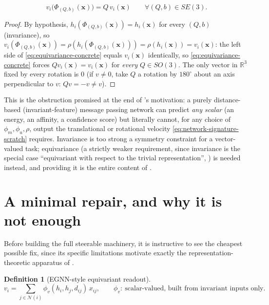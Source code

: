 \documentclass[11pt,a4paper]{report}
\theoremstyle{definition}
\newtheorem{definition}[definition]{Definition}
\theoremstyle{remark}
\newcommand{\RR}{\mathbb R}
\begin{document}
\begin{equation}
\label{eq:equivariance-concrete}
v_i\bigl(\Phi_{(Q,b)}(\mathbf x)\bigr) = Q\,v_i(\mathbf x)
\qquad\forall (Q,b)\in SE(3) .
\end{equation}

\begin{proof}
By hypothesis, $h_i(\Phi_{(Q,b)}(\mathbf x)) = h_i(\mathbf x)$ for every
$(Q,b)$ (invariance), so
$v_i(\Phi_{(Q,b)}(\mathbf x)) = \rho(h_i(\Phi_{(Q,b)}(\mathbf x))) = \rho(h_i(\mathbf x)) = v_i(\mathbf x)$:
the left side of \eqref{eq:equivariance-concrete} equals $v_i(\mathbf x)$
identically, so \eqref{eq:equivariance-concrete} forces
$Qv_i(\mathbf x)=v_i(\mathbf x)$ for \emph{every} $Q\in SO(3)$. The only
vector in $\RR^3$ fixed by every rotation is $0$ (if $v\ne0$, take $Q$ a
rotation by $180^\circ$ about an axis perpendicular to $v$: $Qv=-v\ne v$).
\end{proof}

This is the obstruction promised at the end of 's
motivation: a purely distance-based (invariant-feature) message passing
network can predict \emph{any scalar} (an energy, an affinity, a
confidence score) but literally cannot, for any choice of $\phi_m,\phi_u,\rho$,
output the translational or rotational velocity
\eqref{eq:network-signature-scratch} requires. Invariance is too strong a
symmetry constraint for a vector-valued task; equivariance (a strictly
weaker requirement, since invariance is the special case ``equivariant with
respect to the trivial representation'', ) is needed
instead, and providing it is the entire content of
.

\section{A minimal repair, and why it is not enough}
\label{sec:egnn-scratch}

Before building the full steerable machinery, it is instructive to see the
cheapest possible fix, since its specific limitations motivate exactly the
representation-theoretic apparatus of .

\begin{definition}[EGNN-style equivariant readout]
\label{def:egnn-scratch}
\[
v_i = \sum_{j\in\mathcal N(i)}\phi_v(h_i,h_j,d_{ij})\,x_{ij},
\qquad
\phi_v:\ \text{scalar-valued, built from invariant inputs only.}
\]
\end{definition}
\end{document}

